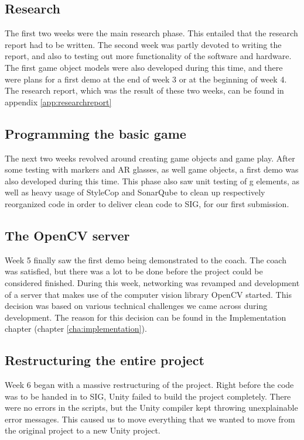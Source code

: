 		\subsection{Research} \label{ssec:research}
			The first two weeks were the main research phase. This entailed that the
			research report had to be written. The second week was partly devoted
			to writing the report, and also to testing out more functionality of
			the software and hardware. The first game object models were also
			developed during this time, and there were plans for a first demo at the end
			of week 3 or at the beginning of week 4. The research report, which was the 
			result of these two weeks, can be found in appendix \ref{app:researchreport}
		
		\subsection{Programming the basic game} \label{ssec:basics}
			The next two weeks revolved around creating game objects and game play.
			After some testing with markers and AR glasses, as well game objects, a 
			first demo was also developed during this time. This phase also saw unit testing of g
			elements, as well as heavy usage of StyleCop and SonarQube to clean up
			respectively reorganized code in order to deliver clean code to SIG, for our first
			submission.  
		
		\subsection{The OpenCV server} \label{ssec:firstdemo}
			Week 5 finally saw the first demo being demonstrated to the coach. The
			coach was satisfied, but there was a lot to be done before the project
			could be considered finished. During this week, networking was revamped
			and development of a server that makes use of the computer vision library
			OpenCV started. This decision was based on various technical challenges we 
			came across during development. The reason for this decision can be found 
			in the Implementation chapter (chapter \ref{cha:implementation}).
		
		\subsection{Restructuring the entire project}
			Week 6 began with a massive restructuring of the project. Right before
			the code was to be handed in to SIG, Unity failed to build the project
			completely. There were no errors in the scripts, but the Unity compiler
			kept throwing unexplainable error messages. This caused us to move 
			everything that we wanted to move from the original project to a new
			Unity project.
			
